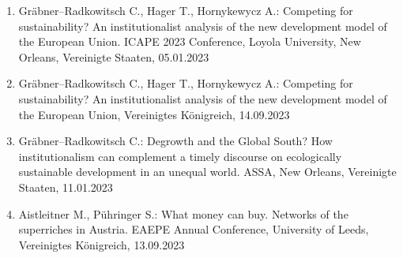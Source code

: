 \begin{enumerate}
	\item Gräbner--Radkowitsch C., Hager T., Hornykewycz A.: Competing for sustainability? An institutionalist analysis of the new development model of the European Union. ICAPE 2023 Conference, Loyola University, New Orleans, Vereinigte Staaten, 05.01.2023
	\item Gräbner--Radkowitsch C., Hager T., Hornykewycz A.: Competing for sustainability? An institutionalist analysis of the new development model of the European Union, Vereinigtes Königreich, 14.09.2023
	\item Gräbner--Radkowitsch C.: Degrowth and the Global South? How institutionalism can complement a timely discourse on ecologically sustainable development in an unequal world. ASSA, New Orleans, Vereinigte Staaten, 11.01.2023
	\item Aistleitner M., Pühringer S.: What money can buy. Networks of the superriches in Austria. EAEPE Annual Conference, University of Leeds, Vereinigtes Königreich, 13.09.2023
\end{enumerate}
